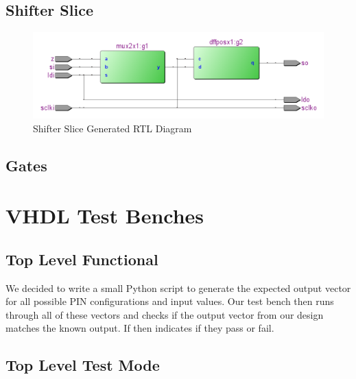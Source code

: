 \documentclass{article}
\begin{document}
    \subsection{Shifter Slice}
        
        \begin{figure}[H]
            \centering
            \includegraphics[width=\linewidth]{../../doc/rtl_pics/shift_slice_rtl.png}
            \caption{Shifter Slice Generated RTL Diagram}
        \end{figure}
    \newpage
    \subsection{Gates}
        
        
        
        

\section{VHDL Test Benches}
    \subsection{Top Level Functional}
        
        We decided to write a small Python script to generate the expected
        output vector for all possible PIN configurations and input values. Our
        test bench then runs through all of these vectors and checks if the
        output vector from our design matches the known output. If then
        indicates if they pass or fail.
        
    \newpage
    \subsection{Top Level Test Mode}
        
\end{document}
